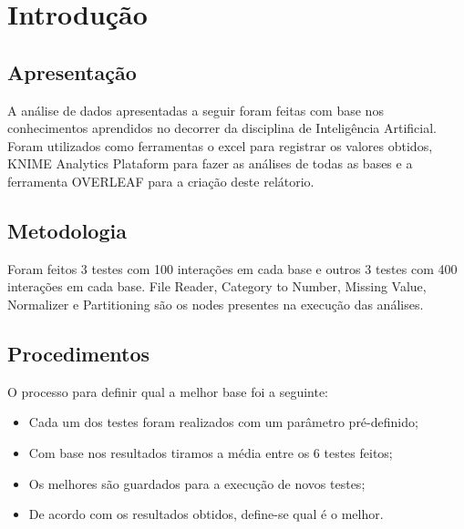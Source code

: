 \section{Introdução}
\label{sec:introducao}

\subsection{Apresentação}
A análise de dados apresentadas a seguir foram feitas com base nos conhecimentos aprendidos no decorrer da disciplina de Inteligência Artificial. Foram utilizados como ferramentas o excel para registrar os valores obtidos, KNIME Analytics Plataform para fazer as análises de todas as bases e a ferramenta OVERLEAF para a criação deste relátorio.

\subsection{Metodologia}
Foram feitos 3 testes com 100 interações em cada base e outros 3 testes com 400 interações em cada base. File Reader, Category to Number, Missing Value, Normalizer e Partitioning são os nodes presentes na execução das análises.

\subsection{Procedimentos}
O processo para definir qual a melhor base foi a seguinte:
\begin{itemize}
    \item Cada um dos testes foram realizados com um parâmetro pré-definido;
    \item Com base nos resultados tiramos a média entre os 6 testes feitos;
    \item Os melhores são guardados para a execução de novos testes;
    \item De acordo com os resultados obtidos, define-se qual é o melhor.
\end{itemize}